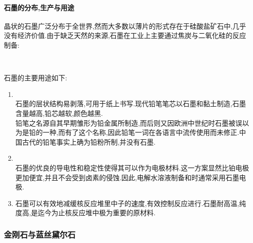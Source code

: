 \documentclass[draft]{ctexart}
\begin{document}
\paragraph{石墨的分布,生产与用途}
晶状的石墨广泛分布于全世界,然而大多数以薄片的形式存在于硅酸盐矿石中,几乎没有经济价值.由于缺乏天然的来源,石墨在工业上主要通过焦炭与二氧化硅的反应制备:
\begin{center}
    \\
\end{center}
石墨的主要用途如下:
\begin{enumerate}[label=\tbf{\arabic*.},topsep=0pt,parsep=0pt,itemsep=0pt,partopsep=0pt]
    \item {}\\
        石墨的层状结构易剥落,可用于纸上书写.现代铅笔笔芯以石墨和黏土制造,石墨含量越高,铅芯越软,颜色越黑.\\
        铅笔之名源自其早期雏形为铅金属所制造,而后则又因欧洲中世纪时石墨被误以为是铅的一种,而有了这个名称,因此铅笔一词在各语言中流传使用而未修正.中国古代的铅笔事实上确为铅粉所制,并没有石墨.
    \item {}\\
        石墨的优良的导电性和稳定性使得其可以作为电极材料.这一方案显然比铂电极更加便宜,并且不会受到卤素的侵蚀.因此,电解水溶液制备和时通常采用石墨电极.
    \item {}
        石墨可以有效地减缓核反应堆里中子的速度,有效控制反应进行.石墨耐高温,纯度高,是迄今为止核反应堆中极为重要的原材料.
\end{enumerate}
\subsubsection{金刚石与蓝丝黛尔石}
\end{document}
